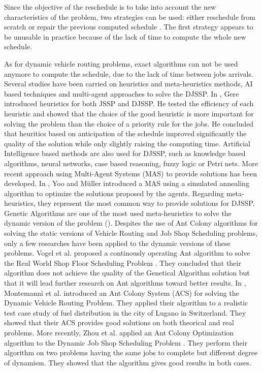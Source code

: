 \documentclass[review]{elsarticle}
\begin{document}
Since the objective of the reschedule is to take into account the new characteristics of the problem, two strategies can be used: either reschedule from scratch or repair the previous computed schedule \cite{Ouelhadj2009}. The first strategy appears to be unusable in practice because of the lack of time to compute the whole new schedule.

As for dynamic vehicle routing problems, exact algorithms can not be used anymore to compute the schedule, due to the lack of time between jobs arrivals. Several studies have been carried on heuristics and meta-heuristics methods, AI based techniques and multi-agent approaches to solve the DJSSP.
In \cite{Gere1966}, Gere introduced heuristics for both JSSP and DJSSP. He tested the efficiency of each heuristic and showed that the choice of the good heuristic is more important for solving the problem than the choice of a priority rule for the jobs. He concluded that heuritics based on anticipation of the schedule improved significantly the quality of the solution while only slightly raising the computing time.
Artificial Intelligence based methods are also used for DJSSP, such as knowledge based algorithms, neural networks, case based reasoning, fuzzy logic or Petri nets.
More recent approach using Multi-Agent Systems (MAS) to provide solutions has been developed. In \cite{Yoo2002}, Yoo and M\"{u}ller introduced a MAS using a simulated annealing algorithm to optimize the solutions proposed by the agents.
Regarding meta-heuristics, they represent the most common way to provide solutions for DJSSP. Genetic Algorithms are one of the most used meta-heuristics to solve the dynamic version of the problem (\cite{Lin1997, Qi2000}).
Despites the use of Ant Colony algorithms for solving the static versions of Vehicle Routing and Job Shop Scheduling problems, only a few researches have been applied to the dynamic versions of these problems. Vogel et al. proposed a continously operating Ant algorithm to solve the Real World Shop Floor Scheduling Problem \cite{Vogel2002}. They concluded that their algorithm does not achieve the quality of the Genetical Algorithm solution but that it will lead further research on Ant algorithms toward better results.
In \cite{Montemanni2005}, Montemanni et al. introduced an Ant Colony System (ACS) for solving the Dynamic Vehicle Routing Problem. They applied their algorithm to a realistic test case study of fuel distribution in the city of Lugano in Switzerland. They showed that their ACS provides good solutions on both theorical and real problems.
More recently, Zhou et al. applied an Ant Colony Optimization algorithm to the Dynamic Job Shop Scheduling Problem \cite{Zhou2008}. They perform their algorithm on two problems having the same jobs to complete but different degree of dynamism. They showed that the algorithm gives good results in both cases.\\
\end{document}
